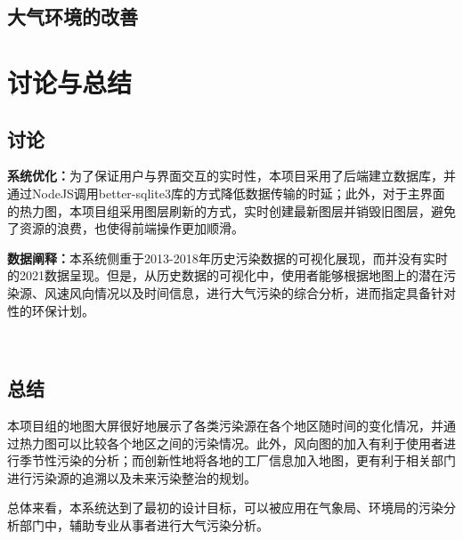 \documentclass[UTF8]{ctexrep}
\begin{document}
    

    \subsection{大气环境的改善}

    \section{讨论与总结}
    \subsection{讨论}
    \textbf{系统优化：}为了保证用户与界面交互的实时性，本项目采用了后端建立数据库，并通过NodeJS调用better-sqlite3库的方式降低数据传输的时延；此外，对于主界面的热力图，本项目组采用图层刷新的方式，实时创建最新图层并销毁旧图层，避免了资源的浪费，也使得前端操作更加顺滑。
    
    \textbf{数据阐释：}本系统侧重于2013-2018年历史污染数据的可视化展现，而并没有实时的2021数据呈现。但是，从历史数据的可视化中，使用者能够根据地图上的潜在污染源、风速风向情况以及时间信息，进行大气污染的综合分析，进而指定具备针对性的环保计划。
     
    ~\\ 
    \subsection{总结}
    本项目组的地图大屏很好地展示了各类污染源在各个地区随时间的变化情况，并通过热力图可以比较各个地区之间的污染情况。此外，风向图的加入有利于使用者进行季节性污染的分析；而创新性地将各地的工厂信息加入地图，更有利于相关部门进行污染源的追溯以及未来污染整治的规划。
    
    总体来看，本系统达到了最初的设计目标，可以被应用在气象局、环境局的污染分析部门中，辅助专业从事者进行大气污染分析。
\end{document}

